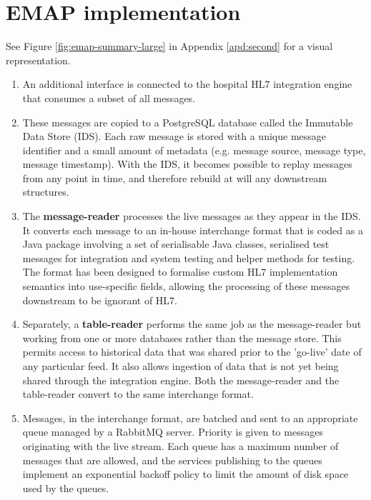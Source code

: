 \documentclass[pmlr,twocolumn,10pt]{jmlr} %
\begin{document}

\newpage


\appendix

\section{EMAP implementation}\label{apd:first}

See Figure \ref{fig:emap-summary-large} in Appendix \ref{apd:second} for a visual representation.

\begin{enumerate}
    \item An additional interface is connected to the hospital HL7 integration engine that consumes a subset of all messages.
    \item These messages are copied to a PostgreSQL database called the Immutable Data Store (IDS). Each raw message is stored with a unique message identifier and a small amount of metadata (e.g. message source, message type, message timestamp). With the IDS, it becomes possible to replay messages from any point in time, and therefore rebuild at will any downstream structures.
    \item The \textbf{message-reader} processes the live messages as they appear in the IDS. It converts each message to an in-house interchange format that is coded as a Java package involving a set of serialisable Java classes, serialised test messages for integration and system testing and helper methods for testing. The format has been designed to formalise custom HL7 implementation semantics into use-specific fields, allowing the processing of these messages downstream to be ignorant of HL7. 
    \item Separately, a \textbf{table-reader} performs the same job as the message-reader but working from one or more databases rather than the message store. This permits access to historical data that was shared prior to the 'go-live' date of any particular feed. It also allows ingestion of data that is not yet being shared through the integration engine. Both the message-reader and the table-reader convert to the same interchange format.
    \item Messages, in the interchange format, are batched and sent to an appropriate queue managed by a RabbitMQ server. Priority is given to messages originating with the live stream. Each queue has a maximum number of messages that are allowed, and the services publishing to the queues implement an exponential backoff policy to limit the amount of disk space used by the queues.

\end{enumerate}
\end{document}
